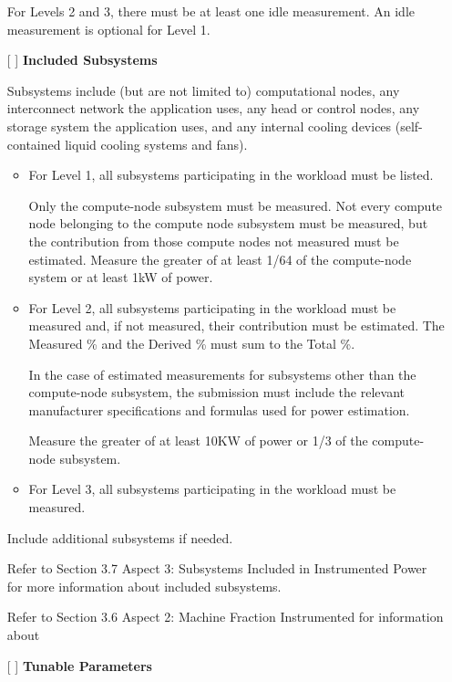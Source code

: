 \begin{itemize}
For Levels 2 and 3, there must be at least one idle measurement. An idle measurement is optional for Level 1. 

\newpage
\item[{[ ]}]
\textbf{Included Subsystems}

Subsystems include (but are not limited to) computational nodes, any interconnect network the application uses, any head or control nodes, any storage system the application uses, and any internal cooling devices (self-contained liquid cooling systems and fans).  

\begin{itemize}
\item
For Level 1, all subsystems participating in the workload must be listed. 

Only the compute-node subsystem must be measured. Not every compute node belonging to the compute node subsystem must be measured, but the contribution from those compute nodes not measured must be estimated.  Measure the greater of at least 1/64 of the compute-node system or at least 1kW of power. 

\item
For Level 2, all subsystems participating in the workload must be measured and, if not measured, their contribution must be estimated. The Measured \% and the Derived \% must sum to the Total \%.

In the case of estimated measurements for subsystems other than the compute-node subsystem, the submission must include the relevant manufacturer specifications and formulas used for power estimation. 

Measure the greater of at least 10KW of power or 1/3 of the compute-node subsystem.

\item
For Level 3, all subsystems participating in the workload must be measured.
\end{itemize}

Include additional subsystems if needed.

Refer to Section 3.7 Aspect 3: Subsystems Included in Instrumented Power for more information about included subsystems.

Refer to Section 3.6 Aspect 2: Machine Fraction Instrumented for information about %
 
\item[{[ ]}]
\textbf{Tunable Parameters}


\end{itemize}
